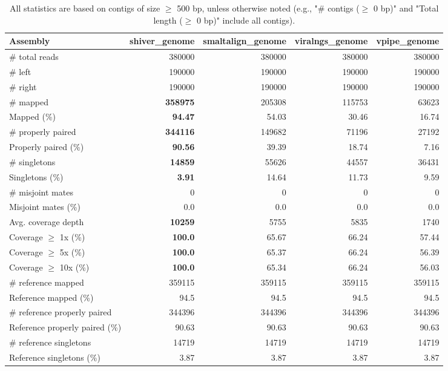\documentclass[12pt,a4paper]{article}
\begin{document}
\begin{table}[ht]
\begin{center}
\caption{All statistics are based on contigs of size $\geq$ 500 bp, unless otherwise noted (e.g., "\# contigs ($\geq$ 0 bp)" and "Total length ($\geq$ 0 bp)" include all contigs).}
\begin{tabular}{|l*{4}{|r}|}
\hline
Assembly & shiver\_genome & smaltalign\_genome & viralngs\_genome & vpipe\_genome \\ \hline
\# total reads & 380000 & 380000 & 380000 & 380000 \\ \hline
\# left & 190000 & 190000 & 190000 & 190000 \\ \hline
\# right & 190000 & 190000 & 190000 & 190000 \\ \hline
\# mapped & {\bf 358975} & 205308 & 115753 & 63623 \\ \hline
Mapped (\%) & {\bf 94.47} & 54.03 & 30.46 & 16.74 \\ \hline
\# properly paired & {\bf 344116} & 149682 & 71196 & 27192 \\ \hline
Properly paired (\%) & {\bf 90.56} & 39.39 & 18.74 & 7.16 \\ \hline
\# singletons & {\bf 14859} & 55626 & 44557 & 36431 \\ \hline
Singletons (\%) & {\bf 3.91} & 14.64 & 11.73 & 9.59 \\ \hline
\# misjoint mates & 0 & 0 & 0 & 0 \\ \hline
Misjoint mates (\%) & 0.0 & 0.0 & 0.0 & 0.0 \\ \hline
Avg. coverage depth & {\bf 10259} & 5755 & 5835 & 1740 \\ \hline
Coverage $\geq$ 1x (\%) & {\bf 100.0} & 65.67 & 66.24 & 57.44 \\ \hline
Coverage $\geq$ 5x (\%) & {\bf 100.0} & 65.37 & 66.24 & 56.39 \\ \hline
Coverage $\geq$ 10x (\%) & {\bf 100.0} & 65.34 & 66.24 & 56.03 \\ \hline
\# reference mapped & 359115 & 359115 & 359115 & 359115 \\ \hline
Reference mapped (\%) & 94.5 & 94.5 & 94.5 & 94.5 \\ \hline
\# reference properly paired & 344396 & 344396 & 344396 & 344396 \\ \hline
Reference properly paired (\%) & 90.63 & 90.63 & 90.63 & 90.63 \\ \hline
\# reference singletons & 14719 & 14719 & 14719 & 14719 \\ \hline
Reference singletons (\%) & 3.87 & 3.87 & 3.87 & 3.87 \\ \hline

\end{tabular}
\end{center}
\end{table}
\end{document}
